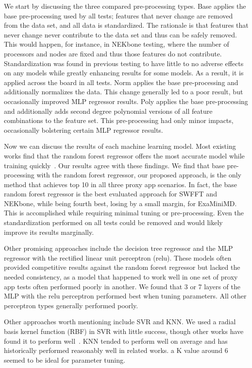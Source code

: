 \documentclass[conference, 10pt, onecolumn, draftclsnofoot]{IEEEtran}
\begin{document}
We start by discussing the three compared pre-processing types.
Base applies the base pre-processing used by all tests; features that never change are removed from the data set, and all data is standardized.
The rationale is that features that never change never contribute to the data set and thus can be safely removed.
This would happen, for instance, in NEKbone testing, where the number of processors and nodes are fixed and thus those features do not contribute.
Standardization was found in previous testing to have little to no adverse effects on any models while greatly enhancing results for some models.
As a result, it is applied across the board in all tests.
Norm applies the base pre-processing and additionally normalizes the data. This change generally led to a poor result, but occasionally improved MLP regressor results.
Poly applies the base pre-processing and additionally adds second degree polynomial versions of all feature combinations to the feature set.
This pre-processing had only minor impacts, occasionally bolstering certain MLP regressor results.

Now we can discuss the results of each machine learning model.
Most existing works find that the random forest regressor offers the most accurate model while training quickly~\cite{survey,7776517,PRIONN,10.1007/978-3-030-48340-1_48}.
Our results agree with these findings.
We find that base pre-processing with the random forest regressor, our proposed approach, is the only method that achieves top 10 in all three proxy app scenarios.
In fact, the base random forest regressor is the best evaluated approach for SWFFT and NEKbone, while being fourth best, losing by a small margin, for ExaMiniMD.
This is accomplished while requiring minimal tuning or pre-processing.
Even the standardization performed on all tests could be removed and would likely improve its results marginally.

Other promising approaches include the decision tree regressor and the MLP regressor with the rectified linear unit perceptron (relu).
These models often provided competitive results against the random forest regressor but lacked the needed consistency, as a model that happened to work well in one set of proxy app tests often performed poorly in another.
We found that 3 or 7 layers of the MLP with the relu perceptron performed best when tuning parameters.
All other perceptron types generally performed poorly.

Other approaches worth mentioning include SVR and KNN.
We used a radial basis kernel function (RBF) in SVR with little success, though other works have found it to perform well~\cite{8725643}.
KNN tended to perform well on average and has historically performed reasonably well in related works.
a K value around 6 seemed to be ideal for parameter tuning.
\end{document}
